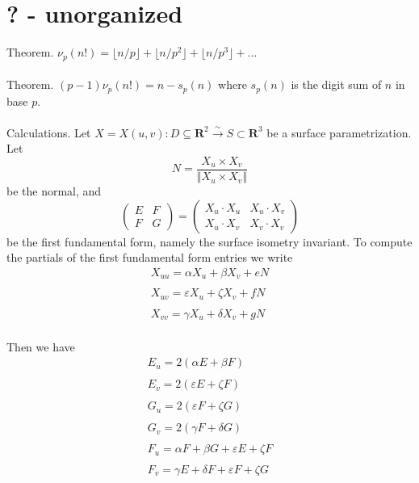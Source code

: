 \documentclass[english]{article}
\newcommand\norm[1]{\left\Vert {#1}\right\Vert }
\renewcommand\to{\longrightarrow}
\def\eps{\varepsilon}
\def\sub{\subseteq}
\def\subn{\subset}
\def\C{\mathbf{C}}
\def\R{\mathbf{R}}
\newcommand\floor[1]{\lfloor{#1}\rfloor}
\begin{document}
\newpage
\section*{? - unorganized}
Theorem. $\nu_p(n!)=\floor{n/p}+\floor{n/p^2}+\floor{n/p^3}+\dots$
\\\\
Theorem. $(p-1)\nu_p(n!)=n-s_p(n)$ where $s_p(n)$ is the digit sum of $n$ in base $p$.
\\\\
Calculations. Let $X=X(u,v):D\sub\R^2\overset{\sim}{\to}S\subn \R^3$ be a surface parametrization. Let $$N=\dfrac{X_u\times X_v}{\norm{X_u\times X_v}}$$ be the normal, and
$$\left(\begin{array}{cc}
E & F\\
F & G
\end{array}\right)=\left(\begin{array}{cc}
X_{u}\cdot X_{u} & X_{u}\cdot X_{v}\\
X_{u}\cdot X_{v} & X_{v}\cdot X_{v}
\end{array}\right)$$ be the first fundamental form, namely the surface isometry invariant. To compute the partials of the first fundamental form entries we write
$$\begin{array}{ccc}
X_{uu} =\alpha X_{u} + \beta X_{v} + eN\\\\
X_{uv} = \eps X_{u} + \zeta X_{v} + fN\\\\
X_{vv} = \gamma X_{u} + \delta X_{v} + gN
\end{array}$$\\
Then we have
$$
\begin{array}{c}
E_{u} = 2(\alpha E+\beta F)\\\\
E_{v} = 2(\eps E+\zeta F)\\\\
G_{u} = 2(\eps F+\zeta G)\\\\
G_{v}  =  2(\gamma F+\delta G)\\\\
F_u=\alpha F + \beta G + \eps E  + \zeta F\\\\
F_v = \gamma E + \delta F + \eps F + \zeta G\\
\end{array}
$$\\
\end{document}
